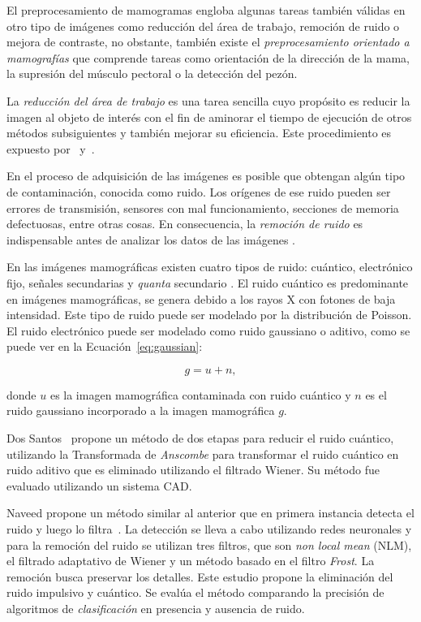 El preprocesamiento de mamogramas engloba algunas tareas también válidas en
otro tipo de imágenes como reducción del área de trabajo, remoción de ruido o
mejora de contraste, no obstante, también existe el \textit{preprocesamiento
orientado a mamografías} que comprende tareas como orientación de la dirección
de la mama, la supresión del músculo pectoral o la detección del pezón.

La \textit{reducción del área de trabajo} es una tarea sencilla cuyo propósito
es reducir la imagen al objeto de interés con el fin de aminorar el tiempo de
ejecución de otros métodos subsiguientes y también mejorar su eficiencia. Este
procedimiento es expuesto por~\cite{holguinpre} y~\cite{dehghani2011method}.

En el proceso de adquisición de las imágenes es posible que obtengan algún tipo
de contaminación, conocida como ruido. Los orígenes de ese ruido pueden ser
errores de transmisión, sensores con mal funcionamiento, secciones de memoria
defectuosas, entre otras cosas. En consecuencia, la \textit{remoción de ruido}
es indispensable antes de analizar los datos de las imágenes
\cite{motwani2004survey}.

En las imágenes mamográficas existen cuatro tipos de ruido: cuántico,
electrónico fijo, señales secundarias y \textit{quanta} secundario
\cite{hashimoto2008practical}. El ruido cuántico es predominante en imágenes
mamográficas, se genera debido a los rayos X con fotones de baja intensidad.
Este tipo de ruido puede ser modelado por la distribución de Poisson. El ruido
electrónico puede ser modelado como ruido gaussiano o aditivo, como se puede
ver en la Ecuación~\ref{eq:gaussian}:

\begin{equation}
\label{eq:gaussian}
            g = u + n,
\end{equation}

\noindent donde $u$ es la imagen mamográfica contaminada con ruido cuántico y
$n$ es el ruido gaussiano incorporado a la imagen mamográfica $g$.

Dos Santos~\cite{dos2009mammography} propone un método de dos etapas para
reducir el ruido cuántico, utilizando la Transformada de \textit{Anscombe} para
transformar el ruido cuántico en ruido aditivo que es eliminado utilizando el
filtrado Wiener. Su método fue evaluado utilizando un sistema CAD. 

Naveed propone un método similar al anterior que en primera instancia detecta
el ruido y luego lo filtra~\cite{naveed2012quantum}. La detección se lleva a
cabo utilizando redes neuronales y para la remoción del ruido se utilizan tres
filtros, que son \textit{non local mean} (NLM), el filtrado adaptativo de Wiener
y un método basado en el filtro \textit{Frost}. La remoción busca preservar los
detalles. Este estudio propone la eliminación del ruido impulsivo y cuántico.
Se evalúa el método comparando la precisión de algoritmos de
\textit{clasificación} en presencia y ausencia de ruido.

